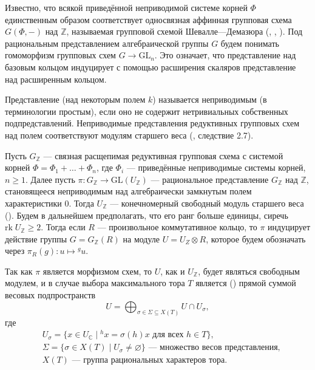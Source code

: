 \documentclass[12pt]{matmex-diploma}
\theoremstyle{mystyleni}
\theoremstyle{mystyle}
\newcommand{\Z}{\mathbb{Z}}
\renewcommand{\C}{\mathbb{C}}
\renewcommand{\ge}{\geqslant}
\begin{document}
Известно, что всякой приведённой неприводимой системе корней $\Phi$ единственным образом соответствует односвязная аффинная групповая схема $G(\Phi,-)$ над $\Z$, называемая групповой схемой Шевалле---Демазюра (\cite{Plotkin1998}, \cite{Steinberg2016}, \cite{Chevalley1960-1961}).
Под рациональным представлением алгебраической группы $G$ будем понимать гомоморфизм групповых схем $G \to \mathrm{GL}_n$. Это означает, что представление над базовым кольцом индуцирует с помощью расширения скаляров представление над расширенным кольцом.

Представление (над некоторым полем $k$) называется неприводимым (в терминологии \cite{Milne2017} простым), если оно не содержит нетривиальных собственных подпредставлений.
Неприводимые представления редуктивных групповых схем над полем соответствуют модулям старшего веса (\cite{Jantzen1987}, следствие 2.7).

Пусть $G_\Z$ --- связная расщепимая редуктивная групповая схема с системой корней $\Phi = \Phi_1 + \dots + \Phi_n$, где $\Phi_i$ --- приведённые неприводимые системы корней, $n \ge 1$.
\linebreak
Далее пусть $\pi:G_\Z \to \mathrm{GL}(U_\Z)$ --- рациональное представление $G_\Z$ над $\Z$, становящееся неприводимым над алгебраически замкнутым полем характеристики $0$. Тогда $U_\Z$ --- конечномерный свободный модуль старшего веса (\cite{Conrad11reductivegroup}). Будем в дальнейшем предполагать, что его ранг больше единицы, сиречь $\mathrm{rk} \; U_\Z \ge 2$.
Тогда если $R$ --- произвольное коммутативное кольцо, то $\pi$ индуцирует действие группы $G=G_\Z(R)$ на модуле $U = U_Z \otimes R$,  которое будем обозначать через $\pi_R(g) : u \mapsto {}^g u$.

Так как $\pi$ является морфизмом схем, то $U$, как и $U_\Z$, будет являться свободным модулем, и в случае выбора максимального тора $T$ является (\citep{Borel1970}) прямой суммой весовых подпространств
$$U=\bigoplus_{\sigma \in \Sigma \subseteq X(T)} {U \cap U_\sigma} ,$$
где
\begin{equation*}
\begin{split}
& U_\sigma = \{x \in U_\C \; | \; ^h x = \sigma(h) x \text{ для всех } h \in T \},\\
& \Sigma = \{\sigma \in X(T) \; | \; U_\sigma \ne \varnothing\} \text{ --- множество весов представления,}\\
& X(T) \text{ --- группа рациональных характеров тора.}
\end{split}
\end{equation*}
\end{document}
